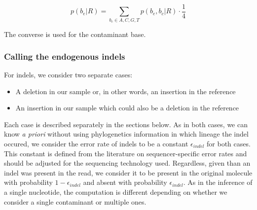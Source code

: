 \documentclass[a4paper,12pt]{article}
\begin{document}
\begin{equation}
  p(b_e|R)   = \sum_{b_c \in {A,C,G,T}} p(b_e,b_c|R) \cdot \frac {1} {4} 
\end{equation} 

\noindent The converse is used for the contaminant base. 

























\subsubsection{Calling the endogenous indels}

For indels, we consider two separate cases:

\begin{itemize}
\item A deletion in our sample or, in other words, an insertion in the reference 
\item An insertion in our sample which could also be a deletion in the reference
\end{itemize}

\noindent Each case is described separately in the sections below. As in both cases, we can know {\it a priori} without using phylogenetics information in which lineage the indel occured, we consider the error rate of indels to be a constant $\epsilon_{indel}$ for both cases. This constant is defined from the literature on sequencer-specific error rates\cite{minoche} and should be adjusted for the sequencing technology used. Regardless, given than an indel was present in the read, we consider it to be present in the original molecule with probability $1-\epsilon_{indel}$ and absent with probability $\epsilon_{indel}$. As in the inference of a single nucleotide, the computation is different depending on whether we consider a single contaminant or multiple ones.
\end{document}
